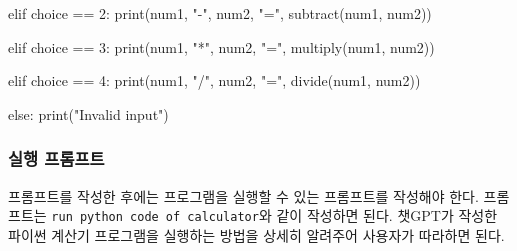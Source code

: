 \documentclass[
  letterpaper,
]{book}
\newenvironment{Shaded}{\begin{snugshade}}{\end{snugshade}}
\newcommand{\BuiltInTok}[1]{\textcolor[rgb]{0.00,0.23,0.31}{#1}}
\newcommand{\ControlFlowTok}[1]{\textcolor[rgb]{0.00,0.23,0.31}{#1}}
\newcommand{\NormalTok}[1]{\textcolor[rgb]{0.00,0.23,0.31}{#1}}
\newcommand{\OperatorTok}[1]{\textcolor[rgb]{0.37,0.37,0.37}{#1}}
\newcommand{\StringTok}[1]{\textcolor[rgb]{0.13,0.47,0.30}{#1}}
\begin{document}
\begin{tcolorbox}
\begin{Shaded}
\begin{Highlighting}[]
\ControlFlowTok{elif}\NormalTok{ choice }\OperatorTok{==} \StringTok{\textquotesingle{}2\textquotesingle{}}\NormalTok{:}
    \BuiltInTok{print}\NormalTok{(num1, }\StringTok{"{-}"}\NormalTok{, num2, }\StringTok{"="}\NormalTok{, subtract(num1, num2))}

\ControlFlowTok{elif}\NormalTok{ choice }\OperatorTok{==} \StringTok{\textquotesingle{}3\textquotesingle{}}\NormalTok{:}
    \BuiltInTok{print}\NormalTok{(num1, }\StringTok{"*"}\NormalTok{, num2, }\StringTok{"="}\NormalTok{, multiply(num1, num2))}

\ControlFlowTok{elif}\NormalTok{ choice }\OperatorTok{==} \StringTok{\textquotesingle{}4\textquotesingle{}}\NormalTok{:}
    \BuiltInTok{print}\NormalTok{(num1, }\StringTok{"/"}\NormalTok{, num2, }\StringTok{"="}\NormalTok{, divide(num1, num2))}

\ControlFlowTok{else}\NormalTok{:}
    \BuiltInTok{print}\NormalTok{(}\StringTok{"Invalid input"}\NormalTok{)}
\end{Highlighting}
\end{Shaded}

\end{tcolorbox}

\hypertarget{uxc2e4uxd589-uxd504uxb86cuxd504uxd2b8}{%
\subsubsection{실행
프롬프트}\label{uxc2e4uxd589-uxd504uxb86cuxd504uxd2b8}}

프롬프트를 작성한 후에는 프로그램을 실행할 수 있는 프롬프트를 작성해야
한다. 프롬프트는 \texttt{run\ python\ code\ of\ calculator}와 같이
작성하면 된다. 챗GPT가 작성한 파이썬 계산기 프로그램을 실행하는 방법을
상세히 알려주어 사용자가 따라하면 된다.
\end{document}
